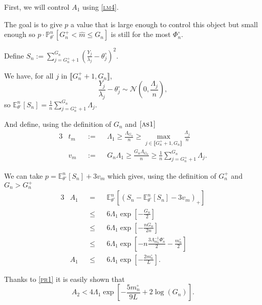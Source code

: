 \medskip

First, we will control $A_{1}$ using \textsc{\cref{lm4}}.

The goal is to give $p$ a value that is large enough to control this object but small enough so $p \cdot \mathds{P}_{\theta^{\circ}}^{n} \left[G_{n}^{+} < \widehat{m} \leq G_{n}\right]$ is still for the most $\Phi_{n}^{\circ}$.

Define $S_{n} := \sum\limits_{j = G_{n}^{+} + 1}^{G_{n}}\left(\frac{Y_{j}}{\lambda_{j}} - \theta^{\circ}_{j}\right)^{2}.$

We have, for all $j$ in $\llbracket G_{n}^{+} + 1, G_{n} \rrbracket$,
\[ \frac{Y_{j}}{\lambda_{j}} - \theta^{\circ}_{j} \sim \mathcal{N}\left(0, \frac{\Lambda_{j}}{n} \right), \]
so $\mathds{E}_{\theta^{\circ}}^{n}\left[S_{n}\right] = \frac{1}{n} \sum\limits_{j = G_{n}^{+} + 1}^{G_{n}} \Lambda_{j}$.

And define, using the definition of $G_{n}$ and $\textsc{\cref{as1}}$
\begin{alignat*}{3}
& t_{m} &&:=&& \Lambda_{1} \geq \frac{\Lambda_{G_{n}}}{n} \geq \max\limits_{j \in \llbracket G_{n}^{+} + 1, G_{n} \rrbracket} \frac{\Lambda_{j}}{n}\\
& v_{m} && := && G_{n} \Lambda_{1} \geq \frac{G_{n} \Lambda_{G_{n}}}{n} \geq  \frac{1}{n} \sum\limits_{j = G_{n}^{+} + 1}^{G_{n}} \Lambda_{j}.
\end{alignat*}

We can take $p = \mathds{E}_{\theta^{\circ}}^{n}\left[S_{n}\right] + 3 v_{m}$ which gives, using the definition of $G_{n}^{+}$ and $G_{n} > G_{n}^{+}$
\begin{alignat*}{3}
& A_{1} && = && \mathds{E}_{\theta^{\circ}}^{n}\left[\left(S_{n} - \mathds{E}_{\theta^{\circ}}^{n}\left[S_{n}\right] - 3 v_{m}\right)_{+}\right]\\
& &&\leq&& 6 \Lambda_{1} \exp\left[- \frac{G_{n}}{2}\right]\\
& &&\leq&& 6 \Lambda_{1} \exp\left[- \frac{n G_{n}}{2n}\right]\\
& &&\leq&& 6 \Lambda_{1} \exp\left[- n \frac{3 \Lambda_{m_{n}^{\circ}}^{-1} \Phi_{n}^{\circ}}{2} - \frac{m_{n}^{\circ}}{2}\right]\\
& A_{1} && \leq && 6 \Lambda_{1} \exp\left[- \frac{2 m_{n}^{\circ}}{L}\right].
\end{alignat*}

\medskip

Thanks to \textsc{\cref{pr1}} it is easily shown that
\[A_{2} < 4 \Lambda_{1} \exp\left[-\frac{5 m_{n}^{\circ}}{9 L} + 2 \log \left(G_{n}\right)\right].\]

